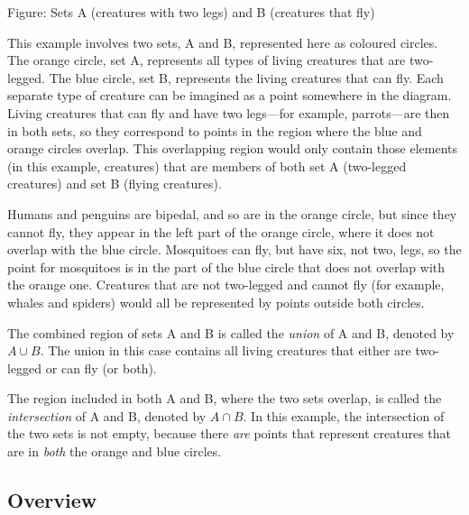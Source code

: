 


Figure: Sets A (creatures with two legs) and B (creatures that fly)



This example involves two sets, A and B, represented here as coloured circles. The orange
circle, set A, represents all types of living creatures that are two-legged. The blue
circle, set B, represents the living creatures that can fly. Each separate type of
creature can be imagined as a point somewhere in the diagram. Living creatures that can
fly and have two legs—for example, parrots—are then in both sets, so they correspond to
points in the region where the blue and orange circles overlap. This overlapping region
would only contain those elements (in this example, creatures) that are members of both
set A (two-legged creatures) and set B (flying creatures).



Humans and penguins are bipedal, and so are in the orange circle, but since they cannot
fly, they appear in the left part of the orange circle, where it does not overlap with the
blue circle. Mosquitoes can fly, but have six, not two, legs, so the point for mosquitoes
is in the part of the blue circle that does not overlap with the orange one. Creatures
that are not two-legged and cannot fly (for example, whales and spiders) would all be
represented by points outside both circles.



The combined region of sets A and B is called the \textit{union} of A and B, denoted by $A
\cup B$. The union in this case contains all living creatures that either are two-legged
or can fly (or both).



The region included in both A and B, where the two sets overlap, is called the
\textit{intersection} of A and B, denoted by $A \cap B$. In this example, the intersection
of the two sets is not empty, because there \textit{are} points that represent creatures
that are in \textit{both} the orange and blue circles.




\subsection{Overview}
\label{sss:over-bce0}




